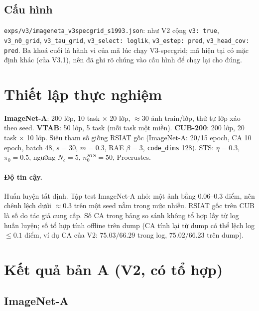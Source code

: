 \documentclass[11pt]{article}
\begin{document}
\subsection{Cấu hình}
\texttt{exps/v3/imageneta\_v3specgrid\_s1993.json}: như V2 cộng \texttt{v3: true}, \texttt{v3\_n0\_grid},
\texttt{v3\_tau\_grid}, \texttt{v3\_select: loglik}, \texttt{v3\_estep: pred}, \texttt{v3\_head\_cov: pred}. Ba khoá cuối
là hành vi của mã lúc chạy V3-specgrid; mã hiện tại có mặc định khác (của V3.1), nên đã ghi rõ chúng vào cấu hình để
chạy lại cho đúng.

\section{Thiết lập thực nghiệm}\label{sec:exp}

\textbf{ImageNet-A}: 200 lớp, 10 task $\times$ 20 lớp, $\approx30$ ảnh train/lớp, thứ tự lớp xáo theo seed.
\textbf{VTAB}: 50 lớp, 5 task (mỗi task một miền). \textbf{CUB-200}: 200 lớp, 20 task $\times$ 10 lớp. Siêu tham số
giống RSIAT gốc (ImageNet-A: 20/15 epoch, CA 10 epoch, batch 48, $s=30$, $m=0.3$, RAE $\beta=3$, \texttt{code\_dims}
128). STS: $\eta=0.3$, $\pi_0=0.5$, ngưỡng $N_c=5$, $n_0^{STS}=50$, Procrustes.

\paragraph{Độ tin cậy.} Huấn luyện tất định. Tập test ImageNet-A nhỏ: một ảnh bằng $0.06$--$0.3$ điểm, nên chênh lệch
dưới $\approx0.3$ trên một seed nằm trong mức nhiễu. RSIAT gốc trên CUB là số do tác giả cung cấp. Số CA trong bảng so
sánh không tổ hợp lấy từ log huấn luyện; số tổ hợp tính offline trên dump (CA tính lại từ dump có thể lệch log
$\le0.1$ điểm, ví dụ CA của V2: $75.03/66.29$ trong log, $75.02/66.23$ trên dump).

\section{Kết quả bản A (V2, có tổ hợp)}\label{sec:res-v2}

\subsection{ImageNet-A}
\end{document}
